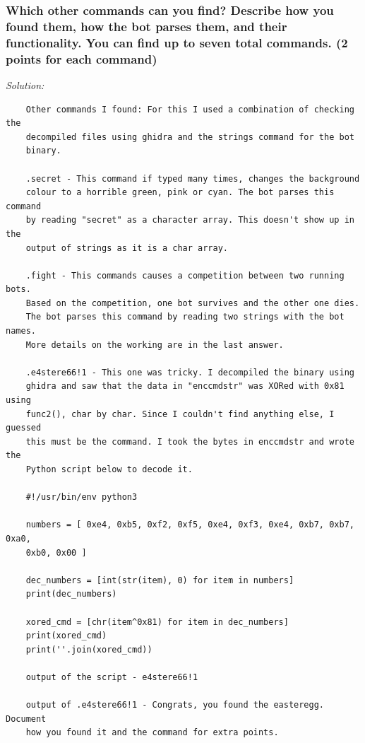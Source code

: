 \documentclass[a4paper,11pt]{article}
\newenvironment{solution}%
{\par{\noindent\small\textit{Solution:}}\vspace{-12pt}\begin{framed}}%
{\end{framed}\par}
\begin{document}
\subsubsection*{Which other commands can you find? Describe how you found them,
how the bot parses them, and their functionality. You can find up to seven total commands.
\ifsolution (2 points for each command) \fi}

\ifsolution
\begin{solution}
\begin{verbatim}
    Other commands I found: For this I used a combination of checking the
    decompiled files using ghidra and the strings command for the bot
    binary.
    
    .secret - This command if typed many times, changes the background 
    colour to a horrible green, pink or cyan. The bot parses this command
    by reading "secret" as a character array. This doesn't show up in the
    output of strings as it is a char array.
    
    .fight - This commands causes a competition between two running bots.
    Based on the competition, one bot survives and the other one dies.
    The bot parses this command by reading two strings with the bot names.
    More details on the working are in the last answer. 
    
    .e4stere66!1 - This one was tricky. I decompiled the binary using 
    ghidra and saw that the data in "enccmdstr" was XORed with 0x81 using
    func2(), char by char. Since I couldn't find anything else, I guessed
    this must be the command. I took the bytes in enccmdstr and wrote the
    Python script below to decode it.
    
    #!/usr/bin/env python3

    numbers = [ 0xe4, 0xb5, 0xf2, 0xf5, 0xe4, 0xf3, 0xe4, 0xb7, 0xb7, 0xa0,
    0xb0, 0x00 ]
    
    dec_numbers = [int(str(item), 0) for item in numbers]
    print(dec_numbers)
    
    xored_cmd = [chr(item^0x81) for item in dec_numbers]
    print(xored_cmd)
    print(''.join(xored_cmd))
    
    output of the script - e4stere66!1

    output of .e4stere66!1 - Congrats, you found the easteregg. Document
    how you found it and the command for extra points.
     
    
    
\end{verbatim}
\end{solution}\fi
\end{document}
